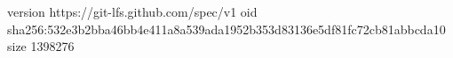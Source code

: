 version https://git-lfs.github.com/spec/v1
oid sha256:532e3b2bba46bb4e411a8a539ada1952b353d83136e5df81fc72cb81abbcda10
size 1398276

